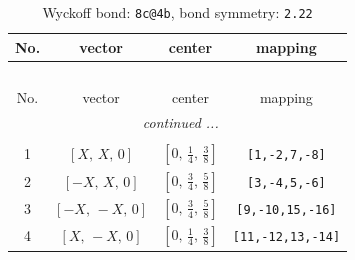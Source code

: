 \documentclass[fleqn,8pt]{jsarticle}
\begin{document}
\renewcommand{\arraystretch}{1.2}
\begin{longtable}{cccc}
\caption{Wyckoff bond: {\tt 8c@4b}, bond symmetry: {\tt 2.22}}
 \\
 \hline \hline
No. & vector & center & mapping \\ \hline \endfirsthead

\multicolumn{3}{l}{\tablename\ \thetable{}} \\
 \hline \hline
No. & vector & center & mapping \\ \hline \endhead

 \hline \hline
\multicolumn{3}{r}{\footnotesize\it continued ...} \\ \endfoot

 \hline \hline
\multicolumn{3}{r}{} \\ \endlastfoot

1 & $\left[ X,\, X,\, 0 \right]$ & $\left[ 0,\, \frac{1}{4},\, \frac{3}{8} \right]$ & {\tt [1,-2,7,-8]} \\ \hline
2 & $\left[ - X,\, X,\, 0 \right]$ & $\left[ 0,\, \frac{3}{4},\, \frac{5}{8} \right]$ & {\tt [3,-4,5,-6]} \\ \hline
3 & $\left[ - X,\, - X,\, 0 \right]$ & $\left[ 0,\, \frac{3}{4},\, \frac{5}{8} \right]$ & {\tt [9,-10,15,-16]} \\ \hline
4 & $\left[ X,\, - X,\, 0 \right]$ & $\left[ 0,\, \frac{1}{4},\, \frac{3}{8} \right]$ & {\tt [11,-12,13,-14]} \\
\end{longtable}
\renewcommand{\arraystretch}{1.2}
\end{document}
